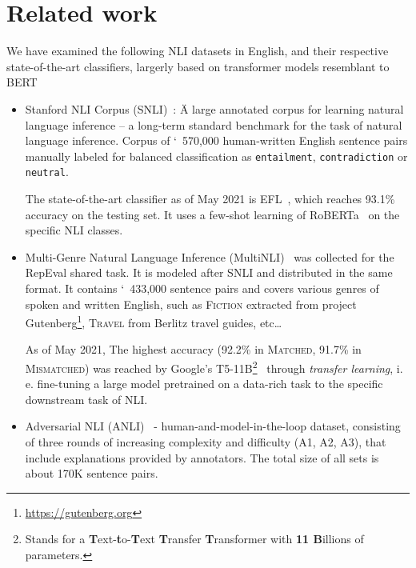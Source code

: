 \section{Related work}
\label{sec:nlicorp}
We have examined the following NLI datasets in English, and their respective state-of-the-art classifiers, largerly based on transformer models resemblant to \textsf{BERT}~\cite{devlin2019bert}
\begin{itemize}
    \item {\techbf Stanford NLI Corpus} ({\techbf SNLI})~\cite{snli:emnlp2015}: \"{A large annotated corpus for learning natural language inference} -- a long-term standard benchmark for the task of natural language inference. Corpus of \char`~570,000 human-written English sentence pairs manually labeled for balanced classification as \texttt{entailment}, \texttt{contradiction} or \texttt{neutral}.
    
    The state-of-the-art classifier as of May 2021 is \textsf{EFL}~\cite{wang2021entailment}, which reaches 93.1\% accuracy on the testing set. It uses a few-shot learning of \textsf{RoBERTa}~\cite{roberta} on the specific NLI classes.
    
    \item {\techbf Multi-Genre Natural Language Inference} ({\techbf MultiNLI})~\cite{multinli} was collected for the \textsf{RepEval} shared task. It is  modeled after \textsf{SNLI} and distributed in the same format. It contains \char`~433,000 sentence pairs and covers various genres of spoken and written English, such as \textsc{Fiction} extracted from project \textsf{Gutenberg}\footnote{\url{https://gutenberg.org}}, \textsc{Travel} from \textsf{Berlitz} travel guides, etc\dots
    
    As of May 2021, The highest accuracy (92.2\% in \textsc{Matched}, 91.7\% in \textsc{Mismatched}) was reached by \textsf{Google}'s \textsf{T5-11B}\footnote{Stands for a \textbf{T}ext-\textbf{t}o-\textbf{T}ext \textbf{T}ransfer \textbf{T}ransformer with \textbf{11 B}illions of parameters.}~\cite{t5-11b} through \textit{transfer learning}, i. e. fine-tuning a large model pretrained on a data-rich task to the specific downstream task of NLI.
    
    \item {\techbf Adversarial NLI} ({\techbf ANLI})~\cite{anli} - human-and-model-in-the-loop dataset, consisting of three rounds of increasing complexity and difficulty (\textsf{A1}, \textsf{A2}, \textsf{A3}), that include explanations provided by annotators. The total size of all sets is about 170K sentence pairs.
    

\end{itemize}
